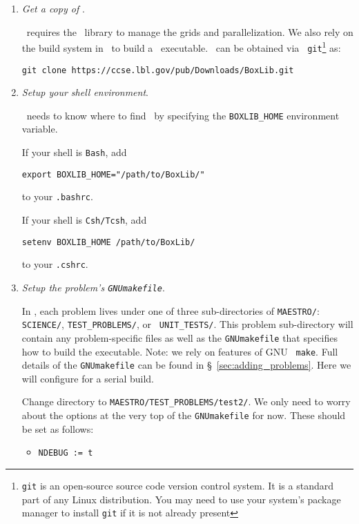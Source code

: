 \begin{enumerate}

\item {\em Get a copy of \boxlib}.

\maestro\ requires the \boxlib\ library to manage the grids and 
parallelization.  We also rely on the build system in \boxlib\ to
build a \maestro\ executable.  \boxlib\ can be obtained via {\tt
git}\footnote{{\tt git} is an open-source source code version control
system.  It is a standard part of any Linux distribution.  You may
need to use your system's package manager to install {\tt git} if it
is not already present} as:
\begin{verbatim}
git clone https://ccse.lbl.gov/pub/Downloads/BoxLib.git
\end{verbatim}


\item {\em Setup your shell environment}.

\maestro\ needs to know where to find \boxlib\, by specifying the 
{\tt BOXLIB\_HOME} environment variable.  

If your shell is {\tt Bash}, add
\begin{verbatim}
export BOXLIB_HOME="/path/to/BoxLib/"
\end{verbatim}
to your {\tt .bashrc}.  

If your shell is {\tt Csh/Tcsh}, add
\begin{verbatim}
setenv BOXLIB_HOME /path/to/BoxLib/
\end{verbatim}
to your {\tt .cshrc}.  


\item {\em Setup the problem's {\tt GNUmakefile}}.

In \maestro, each problem lives under one of three sub-directories of
{\tt MAESTRO/}: {\tt SCIENCE/}, {\tt TEST\_PROBLEMS/}, or {\tt
UNIT\_TESTS/}.  This problem sub-directory will contain any
problem-specific files as well as the {\tt GNUmakefile} that specifies
how to build the executable.  Note: we rely on features of GNU {\tt
make}.  Full details of the {\tt GNUmakefile} can be found
in \S~\ref{sec:adding_problems}.  Here we will configure for a serial
build.

Change directory to {\tt MAESTRO/TEST\_PROBLEMS/test2/}.    
We only need to worry about the options at the very top of the
{\tt GNUmakefile} for now.  These should be set as follows:
\begin{itemize}
\item {\tt NDEBUG := t}


\end{itemize}
\end{enumerate}
